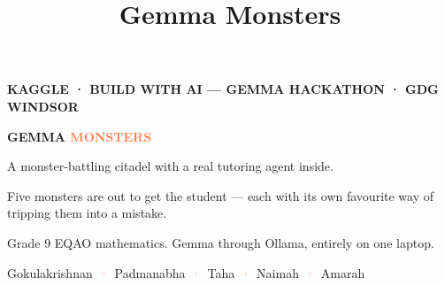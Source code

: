 \documentclass[aspectratio=169,11pt]{beamer}
\title{Gemma Monsters}
\author{}
\date{}
\newcommand{\kicker}[1]{{\color{coral}\scriptsize\bfseries\MakeUppercase{#1}}\\[0.3em]}
\newcommand{\dimt}[1]{{\color{cream!62!gmbg}#1}}
\begin{document}
\begin{frame}
  \begin{center}
    \vspace{1.1em}
    \kicker{Kaggle · Build with AI --- Gemma Hackathon · GDG Windsor}
    {\fontsize{40}{44}\selectfont\bfseries\color{cream} GEMMA \textcolor{coral}{MONSTERS}\par}
    \vspace{0.55em}
    {\Large A monster-battling citadel with a real tutoring agent inside.\par}
    \vspace{0.55em}
    {\color{gold}\large Five monsters are out to get the student --- each with its own
     favourite way of tripping them into a mistake.\par}
    \vspace{0.35em}
    \dimt{Grade 9 EQAO mathematics. Gemma through Ollama, entirely on one laptop.}\par
    \vspace{1.4em}
    {\small Gokulakrishnan \,\textcolor{coral}{·}\, Padmanabha \,\textcolor{coral}{·}\, Taha \,\textcolor{coral}{·}\, Naimah \,\textcolor{coral}{·}\, Amarah}
  \end{center}
\end{frame}
\end{document}

